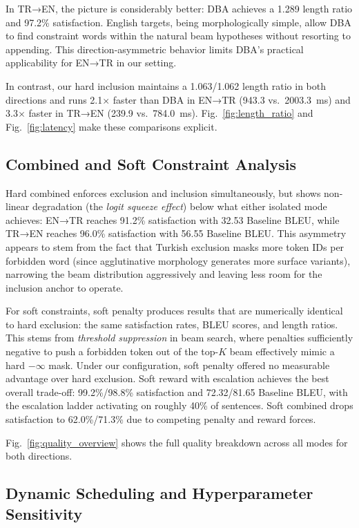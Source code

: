 \documentclass[conference]{IEEEtran}
\begin{document}
In TR→EN, the picture is considerably better: DBA achieves a 1.289 length ratio and 97.2\% satisfaction. English targets, being morphologically simple, allow DBA to find constraint words within the natural beam hypotheses without resorting to appending. This direction-asymmetric behavior limits DBA's practical applicability for EN→TR in our setting.

In contrast, our hard inclusion maintains a 1.063/1.062 length ratio in both directions and runs 2.1$\times$ faster than DBA in EN→TR (943.3 vs.\, 2003.3~ms) and 3.3$\times$ faster in TR→EN (239.9 vs.\, 784.0~ms). Fig.~\ref{fig:length_ratio} and Fig.~\ref{fig:latency} make these comparisons explicit.

\subsection{Combined and Soft Constraint Analysis}

Hard combined enforces exclusion and inclusion simultaneously, but shows non-linear degradation (the \emph{logit squeeze effect}) below what either isolated mode achieves: EN→TR reaches 91.2\% satisfaction with 32.53 Baseline BLEU, while TR→EN reaches 96.0\% satisfaction with 56.55 Baseline BLEU. This asymmetry appears to stem from the fact that Turkish exclusion masks more token IDs per forbidden word (since agglutinative morphology generates more surface variants), narrowing the beam distribution aggressively and leaving less room for the inclusion anchor to operate.

For soft constraints, soft penalty produces results that are numerically identical to hard exclusion: the same satisfaction rates, BLEU scores, and length ratios. This stems from \emph{threshold suppression} in beam search, where penalties sufficiently negative to push a forbidden token out of the top-$K$ beam effectively mimic a hard $-\infty$ mask. Under our configuration, soft penalty offered no measurable advantage over hard exclusion. Soft reward with escalation achieves the best overall trade-off: 99.2\%/98.8\% satisfaction and 72.32/81.65 Baseline BLEU, with the escalation ladder activating on roughly 40\% of sentences. Soft combined drops satisfaction to 62.0\%/71.3\% due to competing penalty and reward forces.

Fig.~\ref{fig:quality_overview} shows the full quality breakdown across all modes for both directions.

\subsection{Dynamic Scheduling and Hyperparameter Sensitivity}
\end{document}
